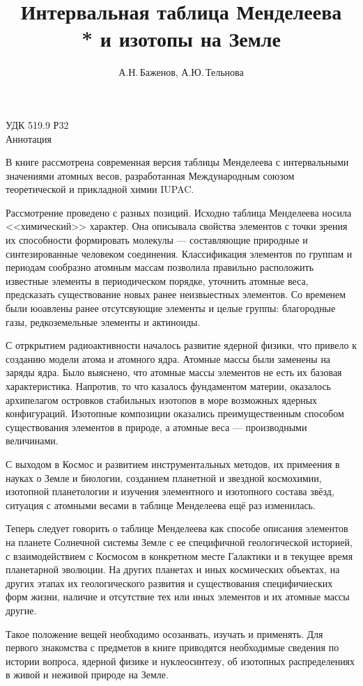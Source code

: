 \documentclass[a5paper,openany]{book}
\title{Интервальная таблица Менделеева\\* 
	и изотопы на Земле}
\author{А.Н.\,Баженов, А.Ю.\,Тельнова}
\begin{document}
	
	\maketitle 
	\newpage
	УДК 519.9
	Р32\\
	
	Аннотация 
	
	
	В книге рассмотрена современная версия таблицы Менделеева с интервальными значениями атомных весов, разработанная Международным союзом теоретической и прикладной химии IUPAC. 
	
	Рассмотрение проведено с разных позиций. Исходно таблица Менделеева носила <<химический>> характер. Она описывала свойства элементов с точки зрения их способности формировать молекулы --- составляющие природные и синтезированные человеком соединения. Классификация элементов по группам и периодам сообразно атомным массам позволила правильно расположить известные элементы в периодическом порядке, уточнить атомные веса, предсказать существование новых ранее неизвыестных элементов.
	Со временем были юоавлены ранее отсутсвующие элементы и целые группы: благородные газы, редкоземельные элементы и актиноиды.
	
	С отркрытием радиоактивности началось развитие ядерной физики, что привело к созданию модели атома и атомного ядра. Атомные массы были заменены на заряды ядра. Было выяснено, что атомные массы элементов не есть их базовая характеристика. Напротив, то что казалось фундаментом материи, оказалось архипелагом островков стабильных изотопов в море возможных ядерных конфигураций.  Изотопные композиции оказались преимущественным способом существования элементов в природе, а атомные веса --- производными величинами.
	
	С выходом в Космос и развитием инструментальных методов, их примеения в науках о Земле и биологии, созданием планетной и звездной космохимии, изотопной планетологии и изучения элементного и изотопного состава звёзд, ситуация с атомными весами в таблице Менделеева ещё раз изменилась.  
	
	Теперь следует говорить о  таблице Менделеева как способе описания элементов на планете Солнечной системы Земле с ее специфичной геологической историей, с взаимодействием с Космосом в конкретном месте Галактики и в текущее время планетарной эволюции.
	На других планетах и иных космических объектах, на других этапах их геологического развития и существования специфичиеских форм жизни, наличие и отсутствие тех или иных элементов и их атомные массы другие.
	
	Такое положение вещей необходимо осозанвать, изучать и применять. Для первого знакомства с предметов в книге   
	приводятся необходимые сведения по истории вопроса, ядерной физике и нуклеосинтезу, об изотопных распределениях в живой и неживой природе на Земле.
	
\end{document}
